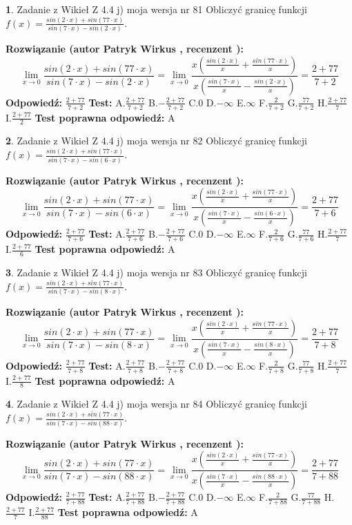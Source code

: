 \documentclass[12pt, a4paper]{article}
\theoremstyle{definition} %
\newtheorem{zad}{}
\newcommand{\zadStart}[1]{\begin{zad}#1\newline}
\newcommand{\zadStop}{\end{zad}}
\newcommand{\rozwStart}[2]{\noindent \textbf{Rozwiązanie (autor #1 , recenzent #2): }\newline}
\newcommand{\rozwStop}{\newline}
\newcommand{\odpStart}{\noindent \textbf{Odpowiedź:}\newline}
\newcommand{\odpStop}{\newline}
\newcommand{\testStart}{\noindent \textbf{Test:}\newline}
\newcommand{\testStop}{\newline}
\newcommand{\kluczStart}{\noindent \textbf{Test poprawna odpowiedź:}\newline}
\newcommand{\kluczStop}{\newline}
\begin{document}
\zadStart{Zadanie z Wikieł Z 4.4 j) moja wersja nr 81}
Obliczyć granicę funkcji $f(x)=\frac{sin(2\cdot x) +sin(77\cdot x)}{sin(7\cdot x) -sin(2\cdot x)}$.
\zadStop
\rozwStart{Patryk Wirkus}{}
$$\lim\limits_{x\to 0}\frac{sin(2\cdot x) +sin(77\cdot x)}{sin(7\cdot x) -sin(2\cdot x)}=\lim\limits_{x\to 0}\frac{x(\frac{sin(2\cdot x)}{x}+\frac{sin(77\cdot x)}{x})}{x(\frac{sin(7\cdot x)}{x}-\frac{sin(2\cdot x)}{x})}=\frac{2+77}{7+2}$$
\rozwStop
\odpStart
$\frac{2+77}{7+2}$
\odpStop
\testStart
A.$\frac{2+77}{7+2}$
B.$-\frac{2+77}{7+2}$
C.$0$
D.$-\infty$
E.$\infty$
F.$\frac{2}{7+2}$
G.$\frac{77}{7+2}$
H.$\frac{2+77}{7}$
I.$\frac{2+77}{2}$
\testStop
\kluczStart
A
\kluczStop



\zadStart{Zadanie z Wikieł Z 4.4 j) moja wersja nr 82}
Obliczyć granicę funkcji $f(x)=\frac{sin(2\cdot x) +sin(77\cdot x)}{sin(7\cdot x) -sin(6\cdot x)}$.
\zadStop
\rozwStart{Patryk Wirkus}{}
$$\lim\limits_{x\to 0}\frac{sin(2\cdot x) +sin(77\cdot x)}{sin(7\cdot x) -sin(6\cdot x)}=\lim\limits_{x\to 0}\frac{x(\frac{sin(2\cdot x)}{x}+\frac{sin(77\cdot x)}{x})}{x(\frac{sin(7\cdot x)}{x}-\frac{sin(6\cdot x)}{x})}=\frac{2+77}{7+6}$$
\rozwStop
\odpStart
$\frac{2+77}{7+6}$
\odpStop
\testStart
A.$\frac{2+77}{7+6}$
B.$-\frac{2+77}{7+6}$
C.$0$
D.$-\infty$
E.$\infty$
F.$\frac{2}{7+6}$
G.$\frac{77}{7+6}$
H.$\frac{2+77}{7}$
I.$\frac{2+77}{6}$
\testStop
\kluczStart
A
\kluczStop



\zadStart{Zadanie z Wikieł Z 4.4 j) moja wersja nr 83}
Obliczyć granicę funkcji $f(x)=\frac{sin(2\cdot x) +sin(77\cdot x)}{sin(7\cdot x) -sin(8\cdot x)}$.
\zadStop
\rozwStart{Patryk Wirkus}{}
$$\lim\limits_{x\to 0}\frac{sin(2\cdot x) +sin(77\cdot x)}{sin(7\cdot x) -sin(8\cdot x)}=\lim\limits_{x\to 0}\frac{x(\frac{sin(2\cdot x)}{x}+\frac{sin(77\cdot x)}{x})}{x(\frac{sin(7\cdot x)}{x}-\frac{sin(8\cdot x)}{x})}=\frac{2+77}{7+8}$$
\rozwStop
\odpStart
$\frac{2+77}{7+8}$
\odpStop
\testStart
A.$\frac{2+77}{7+8}$
B.$-\frac{2+77}{7+8}$
C.$0$
D.$-\infty$
E.$\infty$
F.$\frac{2}{7+8}$
G.$\frac{77}{7+8}$
H.$\frac{2+77}{7}$
I.$\frac{2+77}{8}$
\testStop
\kluczStart
A
\kluczStop



\zadStart{Zadanie z Wikieł Z 4.4 j) moja wersja nr 84}
Obliczyć granicę funkcji $f(x)=\frac{sin(2\cdot x) +sin(77\cdot x)}{sin(7\cdot x) -sin(88\cdot x)}$.
\zadStop
\rozwStart{Patryk Wirkus}{}
$$\lim\limits_{x\to 0}\frac{sin(2\cdot x) +sin(77\cdot x)}{sin(7\cdot x) -sin(88\cdot x)}=\lim\limits_{x\to 0}\frac{x(\frac{sin(2\cdot x)}{x}+\frac{sin(77\cdot x)}{x})}{x(\frac{sin(7\cdot x)}{x}-\frac{sin(88\cdot x)}{x})}=\frac{2+77}{7+88}$$
\rozwStop
\odpStart
$\frac{2+77}{7+88}$
\odpStop
\testStart
A.$\frac{2+77}{7+88}$
B.$-\frac{2+77}{7+88}$
C.$0$
D.$-\infty$
E.$\infty$
F.$\frac{2}{7+88}$
G.$\frac{77}{7+88}$
H.$\frac{2+77}{7}$
I.$\frac{2+77}{88}$
\testStop
\kluczStart
A
\kluczStop
\end{document}
